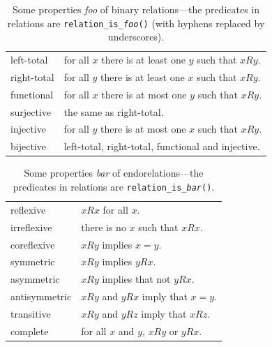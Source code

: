 \documentclass[fleqn]{article}
\newcommand{\pkg}[1]{{\normalfont\fontseries{b}\selectfont #1}}
\newcommand{\var}[1]{\textit{#1}}
\begin{document}
\begin{table}[p]
  \centering
  \begin{tabular}{|l|l|}
    \hline
    left-total & for all $x$ there is at least one $y$
    such that $x R y$.\\
    right-total & for all $y$ there is at least one $x$
    such that $x R y$.\\
    functional & for all $x$ there is at most one $y$
    such that $x R y$.\\
    surjective & the same as right-total.\\
    injective & for all $y$ there is at most one $x$
    such that $x R y$.\\
    bijective & left-total, right-total, functional and
    injective.\\
    \hline
  \end{tabular}
  \caption{Some properties \var{foo} of binary relations---the
    predicates in \pkg{relations} are
    \texttt{relation\_is\_\var{foo}()} (with hyphens replaced by
    underscores).}
  \label{tab:binary}
\end{table}

\begin{table}[p]
  \centering
  \begin{tabular}{|l|l|}
    \hline
    reflexive & $x R x$ for all $x$.\\
    irreflexive & there is no $x$ such that $x R x$.\\
    coreflexive & $x R y$ implies $x = y$.\\
    symmetric & $x R y$ implies $y R x$.\\
    asymmetric & $x R y$ implies that not $y R x$.\\
    antisymmetric & $x R y$ and $y R x$ imply that
    $x = y$.\\
    transitive & $x R y$ and $y R z$ imply that
    $x R z$.\\
    complete & for all $x$ and $y$, $x R y$ or
    $y R x$.\\
    \hline
  \end{tabular}
  \caption{Some properties \var{bar} of endorelations---the predicates
    in \pkg{relations} are \texttt{relation\_is\_\var{bar}()}.}
  \label{tab:endorelations}
\end{table}
\end{document}
